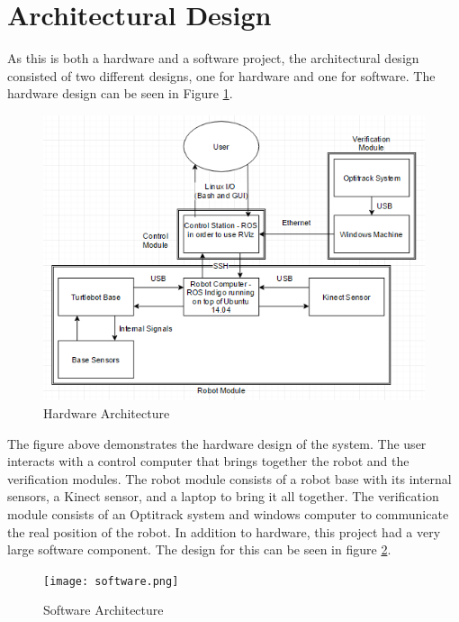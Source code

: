 \documentclass{article}
\newcommand\tab[1][0.5cm]{\hspace*{#1}}
\begin{document}
\section{Architectural Design}\label{fig:arch}
\tab As this is both a hardware and a software project, the architectural design consisted of two different designs, one for hardware and one for software. The hardware design can be seen in Figure \ref{fig:hard}.\\

\begin{figure}[h!]
\centering
\includegraphics[scale=0.8]{hardware_arch.png}
\caption{Hardware Architecture}
\label{fig:hard}
\end{figure}

The figure above demonstrates the hardware design of the system. The user interacts with a control computer that brings together the robot and the verification modules. The robot module consists of a robot base with its internal sensors, a Kinect sensor, and a laptop to bring it all together. The verification module consists of an Optitrack system and windows computer to communicate the real position of the robot.
In addition to hardware, this project had a very large software component. The design for this can be seen in figure \ref{fig:soft}.\\

\begin{figure}[h!]
\centering
\texttt{[image: software.png]}
\caption{Software Architecture}
\label{fig:soft}
\end{figure}
\end{document}
